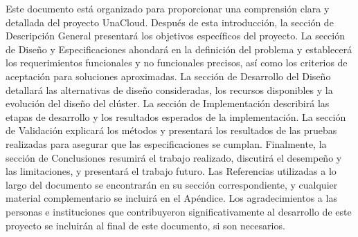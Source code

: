 Este documento está organizado para proporcionar una comprensión clara y detallada del proyecto UnaCloud. Después de esta introducción, la sección de Descripción General presentará los objetivos específicos del proyecto. La sección de Diseño y Especificaciones ahondará en la definición del problema y establecerá los requerimientos funcionales y no funcionales precisos, así como los criterios de aceptación para soluciones aproximadas. La sección de Desarrollo del Diseño detallará las alternativas de diseño consideradas, los recursos disponibles y la evolución del diseño del clúster. La sección de Implementación describirá las etapas de desarrollo y los resultados esperados de la implementación. La sección de Validación explicará los métodos y presentará los resultados de las pruebas realizadas para asegurar que las especificaciones se cumplan. Finalmente, la sección de Conclusiones resumirá el trabajo realizado, discutirá el desempeño y las limitaciones, y presentará el trabajo futuro. Las Referencias utilizadas a lo largo del documento se encontrarán en su sección correspondiente, y cualquier material complementario se incluirá en el Apéndice. Los agradecimientos a las personas e instituciones que contribuyeron significativamente al desarrollo de este proyecto se incluirán al final de este documento, si son necesarios.